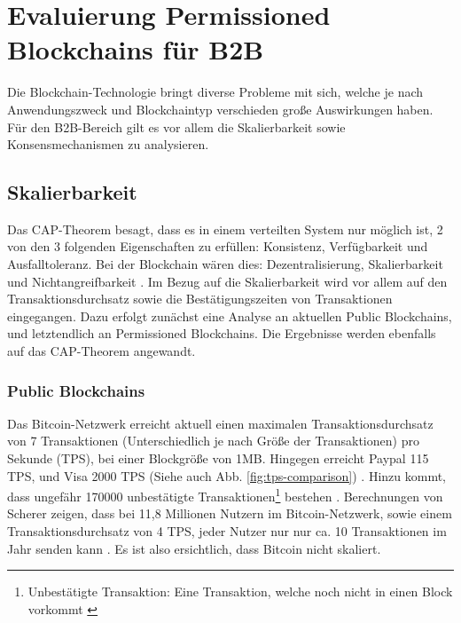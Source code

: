 \chapter{Evaluierung Permissioned Blockchains für B2B}
\label{cha:b2b-eval}

Die Blockchain-Technologie bringt diverse Probleme mit sich, welche je nach Anwendungszweck und Blockchaintyp verschieden große Auswirkungen haben. Für den B2B-Bereich gilt es vor allem die Skalierbarkeit sowie Konsensmechanismen zu analysieren.


\section{Skalierbarkeit}
\label{sec:scalability-eval}
Das CAP-Theorem besagt, dass es in einem verteilten System nur möglich ist, 2 von den 3 folgenden Eigenschaften zu erfüllen: Konsistenz, Verfügbarkeit und Ausfalltoleranz. Bei der Blockchain wären dies: Dezentralisierung, Skalierbarkeit und Nichtangreifbarkeit \cite{SchererPerformanceScalabilityBlockchain2017}. Im Bezug auf die Skalierbarkeit wird vor allem auf den Transaktionsdurchsatz sowie die Bestätigungszeiten von Transaktionen eingegangen. Dazu erfolgt zunächst eine Analyse an aktuellen Public Blockchains, und letztendlich an Permissioned Blockchains. Die Ergebnisse werden ebenfalls auf das CAP-Theorem angewandt. 

\subsection{Public Blockchains}
Das Bitcoin-Netzwerk erreicht aktuell einen maximalen Transaktionsdurchsatz von 7 Transaktionen (Unterschiedlich je nach Größe der Transaktionen) pro Sekunde (TPS), bei einer Blockgröße von 1MB.  Hingegen erreicht Paypal 115 TPS, und Visa 2000 TPS (Siehe auch Abb. \ref{fig:tps-comparison}) \cite{ScalabilityBitcoinWiki}. Hinzu kommt, dass ungefähr 170000 unbestätigte Transaktionen\footnote{Unbestätigte Transaktion: Eine Transaktion, welche noch nicht in einen Block vorkommt \cite{AntonopoulosMasteringbitcoin2015}} bestehen \cite{BlockchainFirmaBlockchainChartsUnbestatigte}. Berechnungen von Scherer zeigen, dass bei 11,8 Millionen Nutzern im Bitcoin-Netzwerk, sowie einem Transaktionsdurchsatz von 4 TPS, jeder Nutzer nur nur ca. 10 Transaktionen im Jahr senden kann \cite{SchererPerformanceScalabilityBlockchain2017}. Es ist also ersichtlich, dass Bitcoin nicht skaliert. 

